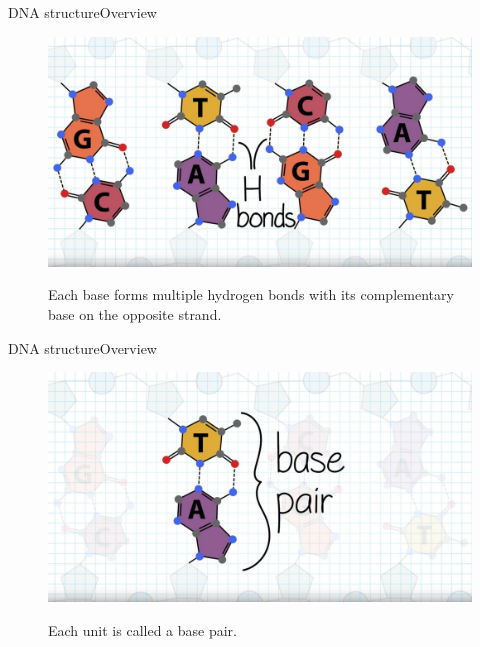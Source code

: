 \documentclass[10pt]{beamer}
\begin{document}
{%
\begin{frame}{DNA structure}{Overview}
	\begin{figure}[]
		\centering
		\includegraphics[width=\textwidth,height=0.7\textheight,keepaspectratio]{img/introduction/dna19.jpg}
		\label{img:mot2}
		\caption{Each base forms multiple hydrogen bonds with its complementary base on the opposite strand.}
	\end{figure}
\end{frame}

\begin{frame}{DNA structure}{Overview}
	\begin{figure}[]
		\centering
		\includegraphics[width=\textwidth,height=0.7\textheight,keepaspectratio]{img/introduction/dna20.jpg}
		\label{img:mot2}
		\caption{Each unit is called a base pair.}
	\end{figure}
\end{frame}

}
\end{document}

